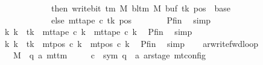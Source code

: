 \begin{isabellebody}
\ \ \ \ \ \ \ \ \ \ \ \ then\ write{\isacharunderscore}{\kern0pt}bit\ {\isacharparenleft}{\kern0pt}{\isasymGamma}{\isacharunderscore}{\kern0pt}tm\ M{\isacharparenright}{\kern0pt}\ {\isacharparenleft}{\kern0pt}bl{\isacharunderscore}{\kern0pt}tm\ M{\isacharparenright}{\kern0pt}\ {\isacharparenleft}{\kern0pt}buf\ tk{\isacharparenright}{\kern0pt}\ {\isacharparenleft}{\kern0pt}pos\ {\isacharminus}{\kern0pt}\ base{\isacharparenright}{\kern0pt}\isanewline
\ \ \ \ \ \ \ \ \ \ \ \ else\ mt{\isacharunderscore}{\kern0pt}tape\ c{}\ tk\ pos{\isacharparenright}{\kern0pt}{\isachardoublequoteclose}\isanewline
\ \ \ \ \ \ \isamarkupfalse%
\ Pfin\ \isamarkupfalse%
\ simp\isanewline
\ \ \ \ \isamarkupfalse%
\ {\isachardoublequoteopen}{\isasymforall}k{\isacharprime}{\kern0pt}{\isachardot}{\kern0pt}\ k{\isacharprime}{\kern0pt}\ {\isasymnoteq}\ tk\ {\isasymlongrightarrow}\ mt{\isacharunderscore}{\kern0pt}tape\ c{\isacharprime}{\kern0pt}\ k{\isacharprime}{\kern0pt}\ {\isacharequal}{\kern0pt}\ mt{\isacharunderscore}{\kern0pt}tape\ c{}\ k{\isacharprime}{\kern0pt}{\isachardoublequoteclose}\ \isamarkupfalse%
\ Pfin\ \isamarkupfalse%
\ simp\isanewline
\ \ \ \ \isamarkupfalse%
\ {\isachardoublequoteopen}{\isasymforall}k{\isacharprime}{\kern0pt}{\isachardot}{\kern0pt}\ k{\isacharprime}{\kern0pt}\ {\isasymnoteq}\ tk\ {\isasymlongrightarrow}\ mt{\isacharunderscore}{\kern0pt}pos\ c{\isacharprime}{\kern0pt}\ k{\isacharprime}{\kern0pt}\ {\isacharequal}{\kern0pt}\ mt{\isacharunderscore}{\kern0pt}pos\ c{}\ k{\isacharprime}{\kern0pt}{\isachardoublequoteclose}\ \isamarkupfalse%
\ Pfin\ \isamarkupfalse%
\ simp\isanewline
\ \ \isamarkupfalse%
\isanewline
{}\isamarkupfalse%
%
\endisatagproof
{\isafoldproof}%
%
\isadelimproof
\isanewline
%
\endisadelimproof
\isanewline
{}\isamarkupfalse%
\ ar{\isacharunderscore}{\kern0pt}write{\isacharunderscore}{\kern0pt}fwd{\isacharunderscore}{\kern0pt}loop{\isacharcolon}{\kern0pt}\isanewline
\ \ \ M\ {\isacharcolon}{\kern0pt}{\isacharcolon}{\kern0pt}\ {\isachardoublequoteopen}{\isacharparenleft}{\kern0pt}{\isacharprime}{\kern0pt}q{\isacharcomma}{\kern0pt}\ {\isacharprime}{\kern0pt}a{\isacharparenright}{\kern0pt}\ mttm{\isachardoublequoteclose}\isanewline
\ \ \ \ \ c{}\ {\isacharcolon}{\kern0pt}{\isacharcolon}{\kern0pt}\ {\isachardoublequoteopen}{\isacharparenleft}{\kern0pt}sym{}{\isacharcomma}{\kern0pt}\ {\isacharprime}{\kern0pt}q\ {\isasymtimes}\ {\isacharprime}{\kern0pt}a\ ar{\isacharunderscore}{\kern0pt}stage{\isacharparenright}{\kern0pt}\ mt{\isacharunderscore}{\kern0pt}config{\isachardoublequoteclose}\isanewline

\end{isabellebody}
